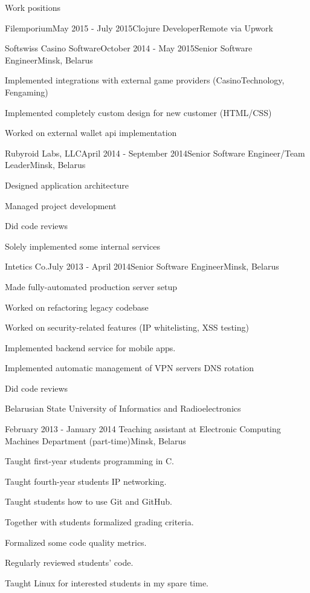 \documentclass{resume} %
\begin{document}
\begin{rSection}{Work positions}
\begin{rSubsection}{Filemporium}{May 2015 - July 2015}{Clojure Developer}{Remote via Upwork}
\end{rSubsection}

\begin{rSubsection}{Softswiss Casino Software}{October 2014 - May 2015}{Senior Software Engineer}{Minsk, Belarus}
\item Implemented integrations with external game providers (CasinoTechnology, Fengaming)
\item Implemented completely custom design for new customer (HTML/CSS)
\item Worked on external wallet api implementation
\end{rSubsection}

\begin{rSubsection}{Rubyroid Labs, LLC}{April 2014 - September 2014}{Senior Software Engineer/Team Leader}{Minsk, Belarus}
\item Designed application architecture
\item Managed project development
\item Did code reviews
\item Solely implemented some internal services
\end{rSubsection}

\begin{rSubsection}{Intetics Co.}{July 2013 - April 2014}{Senior Software Engineer}{Minsk, Belarus}
\item Made fully-automated production server setup
\item Worked on refactoring legacy codebase
\item Worked on security-related features (IP whitelisting, XSS testing)
\item Implemented backend service for mobile apps.
\item Implemented automatic management of VPN servers DNS rotation
\item Did code reviews
\end{rSubsection}

\begin{rSubsection}{\parbox[t][2em][t]{9cm}{Belarusian State University of Informatics and Radioelectronics}}{February 2013 - January 2014 }{Teaching assistant at Electronic Computing Machines Department (part-time)}{Minsk, Belarus}
\item Taught first-year students programming in C.
\item Taught fourth-year students IP networking.
\item Taught students how to use Git and GitHub.
\item Together with students formalized grading criteria.
\item Formalized some code quality metrics.
\item Regularly reviewed students' code.
\item Taught Linux for interested students in my spare time.
\end{rSubsection}


\end{rSection}
\end{document}
